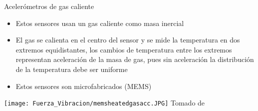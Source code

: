 \documentclass[aspectratio=169]{beamer}
\begin{document}
\begin{frame}{Acelerómetros de gas caliente}
            \begin{itemize}
                \item Estos sensores usan un gas caliente como masa inercial
                \item El gas se calienta en el centro del sensor y se mide la temperatura en dos extremos equidistantes, los cambios de temperatura entre los extremos representan aceleración de la masa de gas, pues sin aceleración la distribución de la temperatura debe ser uniforme
                \item Estos sensores son microfabricados (MEMS)
            \end{itemize}
            \centering
            \texttt{[image: Fuerza\_Vibracion/memsheatedgasacc.JPG]}
            \tiny{Tomado de \cite{Fraden_2016}}
\end{frame}


            
            
\end{document}
